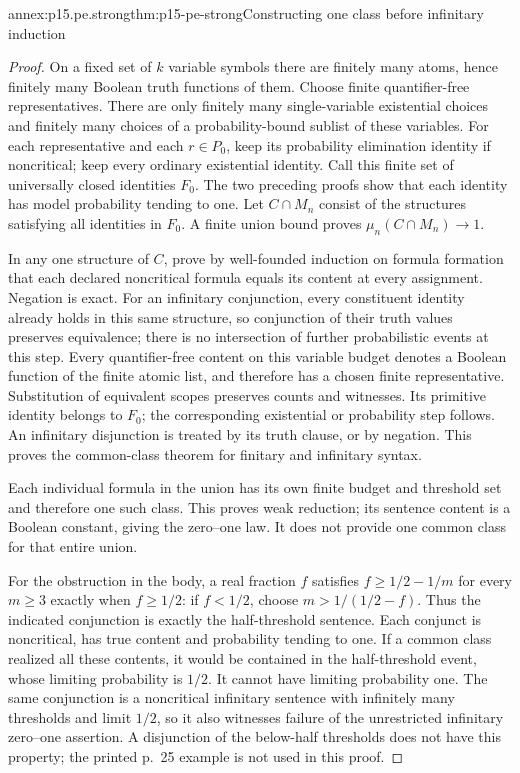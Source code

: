 \begin{annexitem}{annex:p15.pe.strong}{thm:p15-pe-strong}{Constructing one class before infinitary induction}
\begin{proof}
On a fixed set of \(k\) variable symbols there are finitely many atoms,
hence finitely many Boolean truth functions of them. Choose finite
quantifier-free representatives. There are only finitely many
single-variable existential choices and finitely many choices of a
probability-bound sublist of these variables. For each representative
and each \(r\in P_0\), keep its probability elimination identity if
noncritical; keep every ordinary existential identity. Call this finite
set of universally closed identities \(F_0\). The two preceding
proofs show that each identity has model probability tending to one.
Let \(C\cap M_n\) consist of the structures satisfying all identities
in \(F_0\). A finite union bound proves \(\mu_n(C\cap M_n)\to1\).

In any one structure of \(C\), prove by well-founded induction on
formula formation that each declared noncritical formula equals its
content at every assignment. Negation is exact. For an infinitary
conjunction, every constituent identity already holds in this same
structure, so conjunction of their truth values preserves equivalence;
there is no intersection of further probabilistic events at this step.
Every quantifier-free content on this variable budget denotes a
Boolean function of the finite atomic list, and therefore has a chosen
finite representative. Substitution of equivalent scopes preserves
counts and witnesses. Its primitive identity belongs to \(F_0\);
the corresponding existential or probability step follows. An
infinitary disjunction is treated by its truth clause, or by negation.
This proves the common-class theorem for finitary and infinitary syntax.

Each individual formula in the union has its own finite budget and
threshold set and therefore one such class. This proves weak reduction;
its sentence content is a Boolean constant, giving the zero--one law.
It does not provide one common class for that entire union.

For the obstruction in the body, a real fraction \(f\) satisfies
\(f\ge1/2-1/m\) for every \(m\ge3\) exactly when \(f\ge1/2\):
if \(f<1/2\), choose \(m>1/(1/2-f)\). Thus the indicated conjunction
is exactly the half-threshold sentence. Each conjunct is noncritical,
has true content and probability tending to one. If a common class
realized all these contents, it would be contained in the
half-threshold event, whose limiting probability is \(1/2\).
It cannot have limiting probability one. The same conjunction is a
noncritical infinitary sentence with infinitely many thresholds and
limit \(1/2\), so it also witnesses failure of the unrestricted
infinitary zero--one assertion. A disjunction of the below-half
thresholds does not have this property; the printed p.~25 example
is not used in this proof.
\end{proof}
\end{annexitem}

